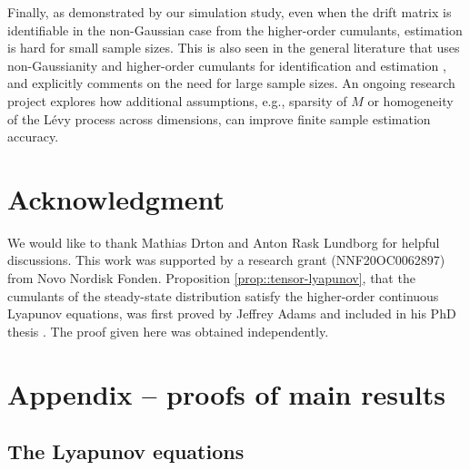 \documentclass{biometrika}
\begin{document}
Finally, as demonstrated by our simulation study, even when the drift matrix 
is identifiable in the non-Gaussian case from the higher-order cumulants, estimation is 
hard for small sample sizes. This is also seen in the general literature that uses 
non-Gaussianity and higher-order cumulants for identification and estimation 
\citep{JMLRv7shimizu06a, schkoda2024causaldiscoverylinearnongaussian, tramontano2025causaleffectidentificationlvlingam}, and \cite{JMLR:Wang_Drton} explicitly 
comments on the need for large sample sizes. An ongoing research project explores how
additional assumptions, e.g., sparsity of $M$ or homogeneity of the Lévy process across 
dimensions, can improve finite sample estimation accuracy.



\section*{Acknowledgment}

We would like to thank Mathias Drton and Anton Rask Lundborg for helpful discussions. This work was supported by a research grant (NNF20OC0062897) from Novo Nordisk Fonden.
Proposition \ref{prop::tensor-lyapunov}, that the cumulants of the steady-state distribution satisfy the higher-order continuous Lyapunov equations, was first proved by Jeffrey Adams and included in his PhD thesis \citep{Jeff:2024}. The proof given here was obtained independently. 



\newpage

\appendix
\appendixone

\section{Appendix -- proofs of main results}
\subsection{The Lyapunov equations} \label{sec:lyapunov-appendix}
\end{document}
